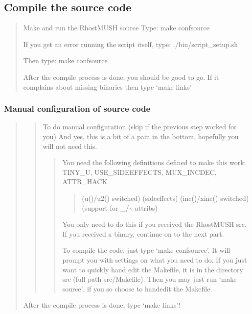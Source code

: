 \documentclass[letterpaper,10pt,english]{sphinxmanual}
\begin{document}
\subsection{Compile the source code}
\label{\detokenize{24-quickinstall:compile-the-source-code}}\begin{quote}

\sphinxAtStartPar
Make and run the RhostMUSH source
Type:  make confsource

\sphinxAtStartPar
If you get an error running the script itself,
type: ./bin/script\_setup.sh

\sphinxAtStartPar
Then type: make confsource

\sphinxAtStartPar
After the compile process is done, you should be good to go.
If it complains about missing binaries then type ‘make links’
\end{quote}


\subsubsection{Manual configuration of source code}
\label{\detokenize{24-quickinstall:manual-configuration-of-source-code}}\begin{quote}
\begin{quote}

\sphinxAtStartPar
To do manual configuration (skip if the previous step worked for you)
And yes, this is a bit of a pain in the bottom, hopefully you
will not need this.
\begin{quote}

\sphinxAtStartPar
You need the following definitions defined to make this
work:  TINY\_U, USE\_SIDEEFFECTS, MUX\_INCDEC, ATTR\_HACK
\begin{quote}

\sphinxAtStartPar
(u()/u2() switched)
(sideeffects)
(inc()/xinc() switched)
(support for \_/\textasciitilde{} attribs)
\end{quote}

\sphinxAtStartPar
You only need to do this if you received the RhostMUSH src.
If you received a binary, continue on to the next part.

\sphinxAtStartPar
To compile the code, just type ‘make confsource’.  It will
prompt you with settings on what you need to do.  If you
just want to quickly hand edit the Makefile, it is in the
directory src (full path src/Makefile).  Then you may just
run ‘make source’, if you so choose to hand\sphinxhyphen{}edit the Makefile.
\end{quote}
\end{quote}

\sphinxAtStartPar
After the compile process is done, type ‘make links’!
\begin{quote}
\end{quote}
\end{quote}
\end{document}
